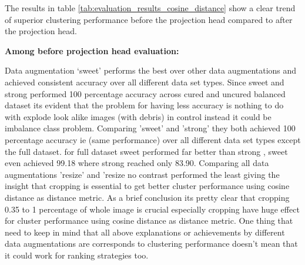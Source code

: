The results in table \ref{tab:evaluation_results_cosine_distance} show a clear trend of superior clustering performance before the projection head compared to after the projection head.

\textbf{Among before projection head evaluation:} 

Data augmentation ‘sweet’ performs the best over other data augmentations and achieved consistent accuracy over all different data set types. Since sweet and strong performed 100 percentage accuracy across cured and uncured balanced dataset its evident that the problem for having less accuracy is nothing to do with explode look alike images (with debris)  in control instead it could be imbalance class problem. Comparing 'sweet' and 'strong' they both achieved 100 percentage accuracy ie (same performance) over all different data set types except the full dataset.
for full dataset sweet performed far better than strong , sweet even achieved 99.18 where strong reached only 83.90. Comparing all data augmentations 'resize' and 'resize no contrast performed the least giving the insight that cropping is essential to get better cluster performance using cosine distance as distance metric. As a brief conclusion its pretty clear that cropping 0.35 to 1 percentage of whole image is crucial especially cropping have huge effect for cluster performance using cosine distance as distance metric. One thing that need to keep in mind that all above explanations or achievements by different data augmentations are corresponds to clustering performance doesn't mean that it could work for ranking strategies too.

